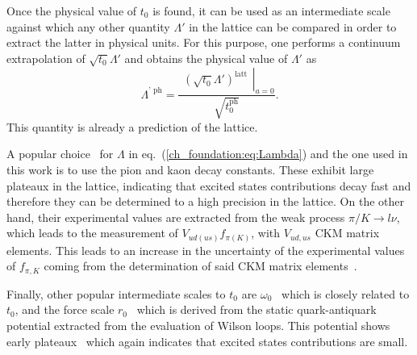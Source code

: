 Once the physical value of $t_0$ is found, it can be used as an intermediate scale against which any other quantity $\Lambda'$ in the lattice can be compared in order to extract the latter in physical units. For this purpose, one performs a continuum extrapolation of $\sqrt{t_0}\Lambda'$ and obtains the physical value of $\Lambda'$ as
\begin{equation}
\Lambda^{\textrm{' ph}}=\frac{\left.\begin{matrix}
\left(\sqrt{t_0}\Lambda'\right)^{\textrm{latt}}
\end{matrix}\right|_{a=0}}{\sqrt{t_0^{\textrm{ph}}}}.
\end{equation}
This quantity is already a prediction of the lattice.

A popular choice~\citep{Brown:2018jtv,BMW:2012hcm,BMW:2012hcm,Bruno:2016plf,Strassberger:2023xnj} for $\Lambda$ in eq.~(\ref{ch_foundation:eq:Lambda}) and the one used in this work is to use the pion and kaon decay constants. These exhibit large plateaux in the lattice, indicating that excited states contributions decay fast and therefore they can be determined to a high precision in the lattice. On the other hand, their experimental values are extracted from the weak process $\pi/K\to l\nu$, which leads to the measurement of $V_{ud(us)}f_{\pi(K)}$, with $V_{ud,us}$ CKM matrix elements. This leads to an increase in the uncertainty of the experimental values of $f_{\pi,K}$ coming from the determination of said CKM matrix elements~\citep{FlavourLatticeAveragingGroupFLAG:2021npn}.

Finally, other popular intermediate scales to $t_0$ are $\omega_0$~\citep{BMW:2012hcm,Kostrzewa:2021syw,MILC:2015tqx} which is closely related to $t_0$, and the force scale $r_0$~\citep{Sommer:1993ce,Necco:2001xg,Bernard:2000gd} which is derived from the static quark-antiquark potential extracted from the evaluation of Wilson loops. This potential shows early plateaux~\citep{Sommer:2014mea} which again indicates that excited states contributions are small.

